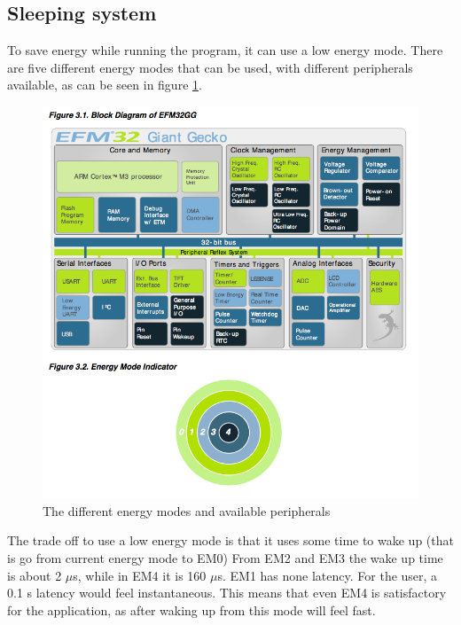 

\subsection{Sleeping system}
\label{subsection:low-energy}

To save energy while running the program, it can use a low energy mode.
There are five different energy modes that can be used, with different peripherals available, as can be seen in figure \ref{fig:energy_modes}.\cite{referencemanual}

\begin{figure}[H]
\centering
\includegraphics[scale=0.5]{figures/energymodes.png}
\caption{The different energy modes and available peripherals}
\label{fig:energy_modes}
\end{figure}

The trade off to use a low energy mode is that it uses some time to wake up (that is go from current energy mode to EM0)
From EM2 and EM3  the wake up time is about 2 $\mu$s, while in EM4 it is 160 $\mu$s.
EM1 has none latency.
For the user, a 0.1 s latency would feel instantaneous.\cite{response}
This means that even EM4 is satisfactory for the application, as after waking up from this mode will feel fast.


